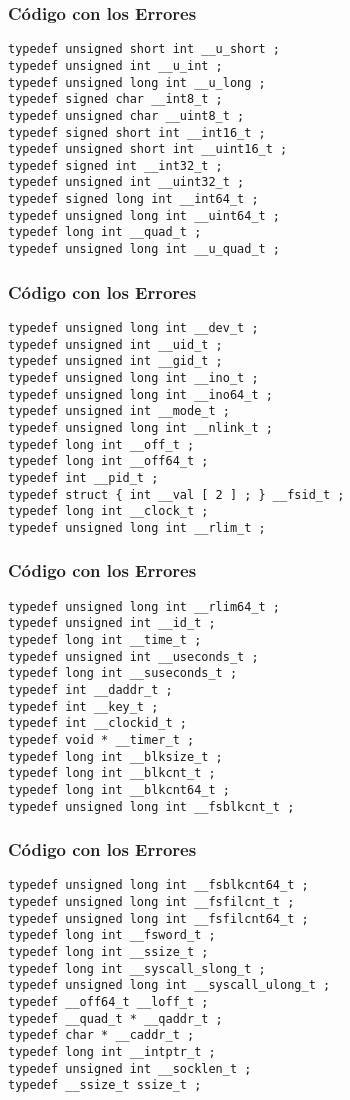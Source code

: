 \documentclass{beamer}
\begin{document}
\begin{frame}[fragile]
\frametitle{C\'odigo con los Errores}
\begin{lstlisting}[style=CStyle]
typedef unsigned short int __u_short ; 
typedef unsigned int __u_int ; 
typedef unsigned long int __u_long ; 
typedef signed char __int8_t ; 
typedef unsigned char __uint8_t ; 
typedef signed short int __int16_t ; 
typedef unsigned short int __uint16_t ; 
typedef signed int __int32_t ; 
typedef unsigned int __uint32_t ; 
typedef signed long int __int64_t ; 
typedef unsigned long int __uint64_t ; 
typedef long int __quad_t ; 
typedef unsigned long int __u_quad_t ; 
\end{lstlisting}
\end{frame}
\begin{frame}[fragile]
\frametitle{C\'odigo con los Errores}
\begin{lstlisting}[style=CStyle]
typedef unsigned long int __dev_t ; 
typedef unsigned int __uid_t ; 
typedef unsigned int __gid_t ; 
typedef unsigned long int __ino_t ; 
typedef unsigned long int __ino64_t ; 
typedef unsigned int __mode_t ; 
typedef unsigned long int __nlink_t ; 
typedef long int __off_t ; 
typedef long int __off64_t ; 
typedef int __pid_t ; 
typedef struct { int __val [ 2 ] ; } __fsid_t ; 
typedef long int __clock_t ; 
typedef unsigned long int __rlim_t ; 
\end{lstlisting}
\end{frame}
\begin{frame}[fragile]
\frametitle{C\'odigo con los Errores}
\begin{lstlisting}[style=CStyle]
typedef unsigned long int __rlim64_t ; 
typedef unsigned int __id_t ; 
typedef long int __time_t ; 
typedef unsigned int __useconds_t ; 
typedef long int __suseconds_t ; 
typedef int __daddr_t ; 
typedef int __key_t ; 
typedef int __clockid_t ; 
typedef void * __timer_t ; 
typedef long int __blksize_t ; 
typedef long int __blkcnt_t ; 
typedef long int __blkcnt64_t ; 
typedef unsigned long int __fsblkcnt_t ; 
\end{lstlisting}
\end{frame}
\begin{frame}[fragile]
\frametitle{C\'odigo con los Errores}
\begin{lstlisting}[style=CStyle]
typedef unsigned long int __fsblkcnt64_t ; 
typedef unsigned long int __fsfilcnt_t ; 
typedef unsigned long int __fsfilcnt64_t ; 
typedef long int __fsword_t ; 
typedef long int __ssize_t ; 
typedef long int __syscall_slong_t ; 
typedef unsigned long int __syscall_ulong_t ; 
typedef __off64_t __loff_t ; 
typedef __quad_t * __qaddr_t ; 
typedef char * __caddr_t ; 
typedef long int __intptr_t ; 
typedef unsigned int __socklen_t ; 
typedef __ssize_t ssize_t ; 
\end{lstlisting}
\end{frame}
\end{document}
